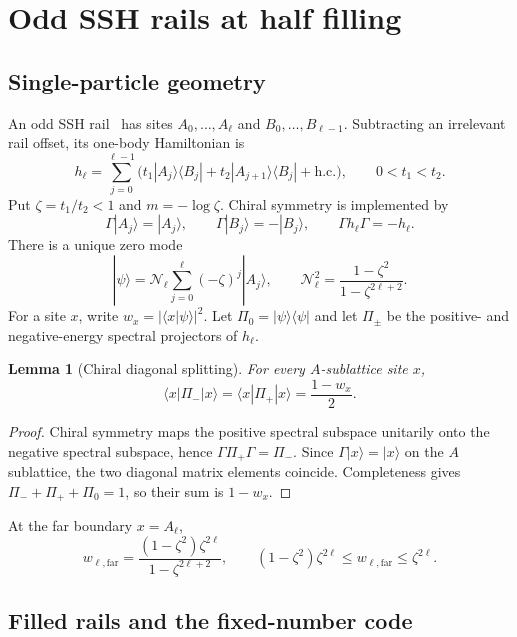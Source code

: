 \documentclass[11pt,a4paper]{article}
\newtheorem{lemma}[theorem]{Lemma}
\theoremstyle{remark}
\newcommand{\hc}{\mathrm{h.c.}}
\begin{document}
\section{Odd SSH rails at half filling}

\subsection{Single-particle geometry}

An odd SSH rail~\cite{SSH} has sites $A_0,\ldots,A_\ell$ and $B_0,\ldots,B_{\ell-1}$.  Subtracting an irrelevant rail offset, its one-body Hamiltonian is
\[
 h_\ell=\sum_{j=0}^{\ell-1}
 \bigl(t_1|A_j\rangle\langle B_j|+t_2|A_{j+1}\rangle\langle B_j|+\hc\bigr),
 \qquad 0<t_1<t_2.
\]
Put $\zeta=t_1/t_2<1$ and $m=-\log\zeta$.  Chiral symmetry is implemented by
\[
 \Gamma|A_j\rangle=|A_j\rangle,\qquad
 \Gamma|B_j\rangle=-|B_j\rangle,\qquad
 \Gamma h_\ell\Gamma=-h_\ell.
\]
There is a unique zero mode
\[
 |\psi\rangle=\mathcal N_\ell\sum_{j=0}^{\ell}(-\zeta)^j|A_j\rangle,
 \qquad
 \mathcal N_\ell^2=\frac{1-\zeta^2}{1-\zeta^{2\ell+2}}.
\]
For a site $x$, write $w_x=|\langle x|\psi\rangle|^2$.  Let $\Pi_0=|\psi\rangle\langle\psi|$ and let $\Pi_\pm$ be the positive- and negative-energy spectral projectors of $h_\ell$.

\begin{lemma}[Chiral diagonal splitting]\label{lem:chiral}
For every $A$-sublattice site $x$,
\[
 \langle x|\Pi_-|x\rangle
 =\langle x|\Pi_+|x\rangle
 =\frac{1-w_x}{2}.
\]
\end{lemma}

\begin{proof}
Chiral symmetry maps the positive spectral subspace unitarily onto the negative spectral subspace, hence $\Gamma\Pi_+\Gamma=\Pi_-$.  Since $\Gamma|x\rangle=|x\rangle$ on the $A$ sublattice, the two diagonal matrix elements coincide.  Completeness gives $\Pi_-+\Pi_++\Pi_0=1$, so their sum is $1-w_x$.
\end{proof}

At the far boundary $x=A_\ell$,
\begin{equation}\label{eq:wfar}
 w_{\ell,\mathrm{far}}
 =\frac{(1-\zeta^2)\zeta^{2\ell}}{1-\zeta^{2\ell+2}},
 \qquad
 (1-\zeta^2)\zeta^{2\ell}\le w_{\ell,\mathrm{far}}\le\zeta^{2\ell}.
\end{equation}

\subsection{Filled rails and the fixed-number code}
\end{document}
